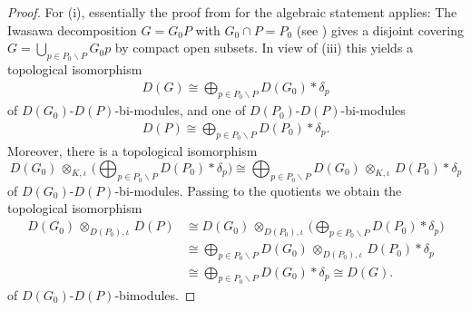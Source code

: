 \documentclass[a4paper, reqno, 10pt]{amsart}
\theoremstyle{definition}
\numberwithin{equation}{section}
\newcommand{\botimes}[1]{{\,\otimes_{#1}\,}}
\newcommand{\indotimes}{{\,\otimes_{K,\iota}\,}}
\begin{document}
\begin{proof}
	For (i), essentially the proof from \cite[Lemma 6.1 (i)]{SchneiderTeitelbaum05DualAdmLocAnRep} for the algebraic statement applies:
	The Iwasawa decomposition $G = G_0 P$ with $G_0 \cap P = P_0$ (see \cite[\S 3.5]{Cartier79ReppAdicGrpsSurvey}) gives a disjoint covering $G = \bigcup_{p \in P_0 \backslash P} G_0 p$ by compact open subsets.
	In view of  (iii) this yields a topological isomorphism
	\begin{align*}
		D(G) \cong \bigoplus_{p \in P_0 \backslash P} D(G_0) \ast \delta_p
	\end{align*}
	of $D(G_0)$-$D(P)$-bi-modules, and one of $D(P_0)$-$D(P)$-bi-modules
	\begin{align*}
		D(P) \cong \bigoplus_{p \in P_0 \backslash P} D(P_0) \ast \delta_p .
	\end{align*}
	Moreover, there is a topological isomorphism \cite[Lemma 1.2.13]{Kohlhaase05InvDistpAdicAnGrp}
	\begin{equation*}
		D(G_0) \indotimes \bigg( \bigoplus_{p \in P_0 \backslash P} D(P_0) \ast \delta_p \bigg)  \cong \bigoplus_{p \in P_0 \backslash P} D(G_0) \indotimes D(P_0) \ast \delta_p 
	\end{equation*}
	of $D(G_0)$-$D(P)$-bi-modules.
	Passing to the quotients we obtain the topological isomorphism
	\begin{align*}
		D(G_0) \botimes{D(P_0),\iota} D(P)
		&\cong D(G_0) \botimes{D(P_0),\iota} \bigg( \bigoplus_{p \in P_0 \backslash P} D(P_0) \ast \delta_p \bigg) \\
		&\cong \bigoplus_{p \in P_0 \backslash P} D(G_0) \botimes{D(P_0),\iota} D(P_0) \ast \delta_p \\
		&\cong \bigoplus_{p \in P_0 \backslash P} D(G_0) \ast \delta_p \cong D(G).
	\end{align*}
	of $D(G_0)$-$D(P)$-bimodules.	
	
	


\end{proof}
\end{document}
